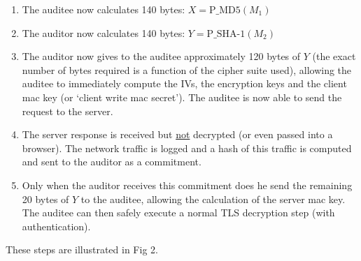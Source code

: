 \documentclass[10pt,a4paper]{article}
\begin{document}
\begin{enumerate}
\setcounter{enumi}{\theenumTemp}
\item The auditee now calculates 140 bytes: $X = \textrm{P\_MD5}(M_1)$
\item The auditor now calculates 140 bytes: $Y = \textrm{P\_SHA-1}(M_2)$
\item The auditor now gives to the auditee approximately 120 bytes of $Y$ (the exact number of bytes required is a function of the cipher suite used), allowing the auditee to immediately compute the IVs, the encryption keys and the client mac key (or `client write mac secret'). The auditee is now able to send the request to the server.
\item The server response is received but \underline{not} decrypted (or even passed into a browser). The network traffic is logged and a hash of this traffic is computed and sent to the auditor as a commitment.
\item Only when the auditor receives this commitment does he send the remaining 20 bytes of $Y$ to the auditee, allowing the calculation of the server mac key. The auditee can then safely execute a normal TLS decryption step (with authentication).
\end{enumerate}

These steps are illustrated in Fig 2.

\pagebreak
\end{document}
